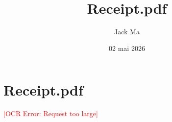 \documentclass[12pt,a4paper]{article}
\title{Receipt.pdf}
\author{Jack Ma}
\date{02 mai 2026}
\begin{document}
\maketitle

\section*{Receipt.pdf}
\textcolor{red}{[OCR Error: Request too large]}
\end{document}
